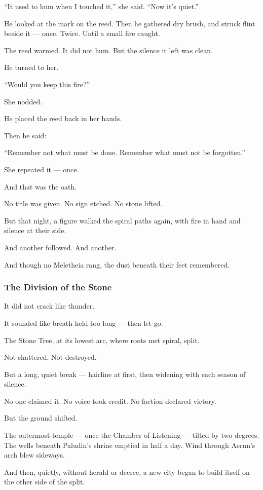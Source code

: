 \documentclass[12pt]{article}
\begin{document}
 “It used to hum when I touched it,” she said.  
 “Now it’s quiet.”

He looked at the mark on the reed.  
Then he gathered dry brush,  
and struck flint beside it —  
once.  
Twice.  
Until a small fire caught.

The reed warmed.  
It did not hum.  
But the silence it left was clean.

He turned to her.

 “Would you keep this fire?”

She nodded.

He placed the reed back in her hands.

Then he said:

 “Remember not what must be done.  
 Remember what must not be forgotten.”

She repeated it — once.

And that was the oath.

No title was given.  
No sign etched.  
No stone lifted.

But that night, a figure walked the spiral paths again,  
with fire in hand  
and silence at their side.

And another followed.  
And another.

And though no Meletheia rang,  
the dust beneath their feet remembered.

\dotfill

\subsubsection{The Division of the Stone}


It did not crack like thunder.

It sounded like breath held too long —  
then let go.

The Stone Tree, at its lowest arc,  
where roots met spiral,  
split.

Not shattered. Not destroyed.

But a long, quiet break —  
hairline at first,  
then widening with each season of silence.

No one claimed it.  
No voice took credit.  
No faction declared victory.

But the ground shifted.

The outermost temple — once the Chamber of Listening — tilted by two degrees.  
The wells beneath Paludin’s shrine emptied in half a day.  
Wind through Aerun’s arch blew sideways.

And then, quietly, without herald or decree,  
a new city began to build itself on the other side of the split.
\end{document}
